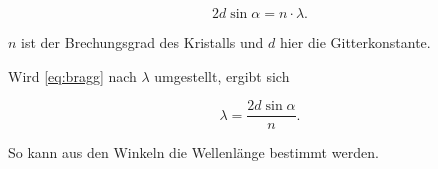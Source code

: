 \begin{equation}
    2 d \sin{\alpha} = n \cdot \lambda.
    \label{eq:bragg}
\end{equation}

$n$ ist der Brechungsgrad des Kristalls und $d$ hier die Gitterkonstante.

Wird \eqref{eq:bragg} nach $\lambda$ umgestellt, ergibt sich 

\begin{equation}
   \lambda = \frac{2 d \sin{\alpha}}{n}.
   \label{eq:lambda}
\end{equation}

So kann aus den Winkeln die Wellenlänge bestimmt werden.
